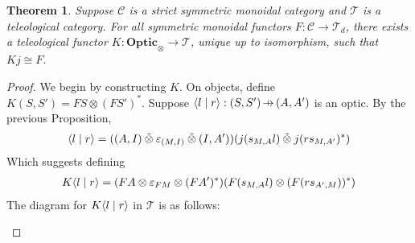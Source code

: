 \documentclass[11pt,a4paper]{article}
\theoremstyle{plain}
\newtheorem{theorem}{Theorem}[subsection]
\theoremstyle{definition}
\newcommand{\C}{\mathscr{C}}
\newcommand{\T}{\mathscr{T}}
\newcommand{\Optic}{\mathbf{Optic}}
\newcommand{\switched}{\mathbin{\tilde{\otimes}}}
\newcommand{\rep}[2]{{\ensuremath \left\langle #1 \mid #2 \right\rangle}}
\newcommand{\hto}{\ensuremath{\,\mathaccent\shortmid\rightarrow\,}}
\begin{document}
\begin{theorem}
  \label{optic-is-free-teleological-cat}
  Suppose $\C$ is a strict symmetric monoidal category and $\T$ is a teleological category. For all symmetric monoidal functors $F : \C \to \T_d$, there exists a teleological functor $K : \Optic_\otimes \to \T$, unique up to isomorphism, such that $Kj \cong F$.
\end{theorem}
\begin{proof}
  We begin by constructing $K$. On objects, define $K(S, S') = FS \otimes (FS')^*$. Suppose $\rep{l}{r} : (S, S') \hto (A, A')$ is an optic. By the previous Proposition,
  \begin{align*}
    \rep{l}{r} = ((A, I) \switched \varepsilon_{(M, I)} \switched (I, A'))(j(s_{M,A}l) \switched j(rs_{M,A'})^*)
  \end{align*}
  Which suggests defining
  \begin{align*}
    K\rep{l}{r} = (FA \otimes \varepsilon_{FM} \otimes (FA')^*)(F(s_{M,A}l) \otimes (F(rs_{A', M}))^* )
  \end{align*}
  The diagram for $K\rep{l}{r}$ in $\T$ is as follows:
  \begin{center}
    
  \end{center}
  

\end{proof}
\end{document}
